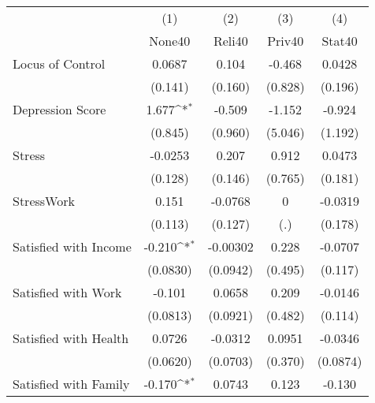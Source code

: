 {
\def\sym#1{\ifmmode^{#1}\else\(^{#1}\)\fi}
\begin{tabular}{l*{4}{c}}
\hline\hline
            &\multicolumn{1}{c}{(1)}&\multicolumn{1}{c}{(2)}&\multicolumn{1}{c}{(3)}&\multicolumn{1}{c}{(4)}\\
            &\multicolumn{1}{c}{None40}&\multicolumn{1}{c}{Reli40}&\multicolumn{1}{c}{Priv40}&\multicolumn{1}{c}{Stat40}\\
\hline
Locus of Control&      0.0687         &       0.104         &      -0.468         &      0.0428         \\
            &     (0.141)         &     (0.160)         &     (0.828)         &     (0.196)         \\
[1em]
Depression Score&       1.677\sym{*}  &      -0.509         &      -1.152         &      -0.924         \\
            &     (0.845)         &     (0.960)         &     (5.046)         &     (1.192)         \\
[1em]
Stress      &     -0.0253         &       0.207         &       0.912         &      0.0473         \\
            &     (0.128)         &     (0.146)         &     (0.765)         &     (0.181)         \\
[1em]
StressWork  &       0.151         &     -0.0768         &           0         &     -0.0319         \\
            &     (0.113)         &     (0.127)         &         (.)         &     (0.178)         \\
[1em]
Satisfied with Income&      -0.210\sym{*}  &    -0.00302         &       0.228         &     -0.0707         \\
            &    (0.0830)         &    (0.0942)         &     (0.495)         &     (0.117)         \\
[1em]
Satisfied with Work&      -0.101         &      0.0658         &       0.209         &     -0.0146         \\
            &    (0.0813)         &    (0.0921)         &     (0.482)         &     (0.114)         \\
[1em]
Satisfied with Health&      0.0726         &     -0.0312         &      0.0951         &     -0.0346         \\
            &    (0.0620)         &    (0.0703)         &     (0.370)         &    (0.0874)         \\
[1em]
Satisfied with Family&      -0.170\sym{*}  &      0.0743         &       0.123         &      -0.130         \\

\end{tabular}}
